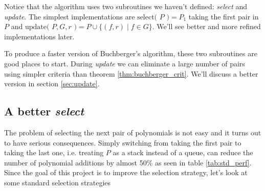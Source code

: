 \documentclass{article}
\theoremstyle{changedot}
\theoremstyle{changedotbreak}
\theoremstyle{nonumberplain}
\begin{document}
Notice that the algorithm uses two subroutines we haven't defined: \emph{select} and \emph{update}. The simplest implementations are $\text{select( $P$ )} = P_{1}$ taking the first pair in $P$ and $\text{update( $P, G, r$ )} = P \cup \{(f, r) \mid f \in G\}$. We'll see better and more refined implementations later.

To produce a faster version of Buchberger's algorithm, these two subroutines are good places to start. During \emph{update} we can eliminate a large number of pairs using simpler criteria than theorem \ref{thm:buchberger_crit}. We'll discuss a better version in section \ref{sec:update}.

\subsection{A better \emph{select}} \label{sec:select}

The problem of selecting the next pair of polynomials is not easy and it turns out to have serious consequences. Simply switching from taking the first pair to taking the last one, i.e. treating $P$ as a stack instead of a queue, can reduce the number of polynomial additions by almost 50\% as seen in table \ref{tab:std_perf}. Since the goal of this project is to improve the selection strategy, let's look at some standard selection strategies
\end{document}
